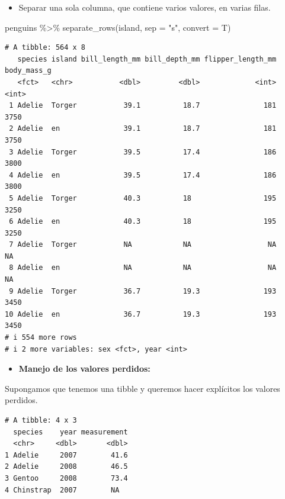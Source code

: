 \documentclass[
  letterpaper,
  DIV=11,
  numbers=noendperiod]{scrreprt}
\newenvironment{Shaded}{\begin{snugshade}}{\end{snugshade}}
\newcommand{\AttributeTok}[1]{\textcolor[rgb]{0.40,0.45,0.13}{#1}}
\newcommand{\FunctionTok}[1]{\textcolor[rgb]{0.28,0.35,0.67}{#1}}
\newcommand{\NormalTok}[1]{\textcolor[rgb]{0.00,0.23,0.31}{#1}}
\newcommand{\SpecialCharTok}[1]{\textcolor[rgb]{0.37,0.37,0.37}{#1}}
\newcommand{\StringTok}[1]{\textcolor[rgb]{0.13,0.47,0.30}{#1}}
\providecommand{\tightlist}{%
  \setlength{\itemsep}{0pt}\setlength{\parskip}{0pt}}\usepackage{longtable,booktabs,array}
\begin{document}
\begin{itemize}
\tightlist
\item
  Separar una sola columna, que contiene varios valores, en varias
  filas.
\end{itemize}

\begin{Shaded}
\begin{Highlighting}[]
\NormalTok{penguins }\SpecialCharTok{\%\textgreater{}\%} \FunctionTok{separate\_rows}\NormalTok{(island, }\AttributeTok{sep =} \StringTok{"s"}\NormalTok{, }\AttributeTok{convert =}\NormalTok{ T)}
\end{Highlighting}
\end{Shaded}

\begin{verbatim}
# A tibble: 564 x 8
   species island bill_length_mm bill_depth_mm flipper_length_mm body_mass_g
   <fct>   <chr>           <dbl>         <dbl>             <int>       <int>
 1 Adelie  Torger           39.1          18.7               181        3750
 2 Adelie  en               39.1          18.7               181        3750
 3 Adelie  Torger           39.5          17.4               186        3800
 4 Adelie  en               39.5          17.4               186        3800
 5 Adelie  Torger           40.3          18                 195        3250
 6 Adelie  en               40.3          18                 195        3250
 7 Adelie  Torger           NA            NA                  NA          NA
 8 Adelie  en               NA            NA                  NA          NA
 9 Adelie  Torger           36.7          19.3               193        3450
10 Adelie  en               36.7          19.3               193        3450
# i 554 more rows
# i 2 more variables: sex <fct>, year <int>
\end{verbatim}

\begin{itemize}
\tightlist
\item
  \textbf{Manejo de los valores perdidos:}
\end{itemize}

Supongamos que tenemos una tibble y queremos hacer explícitos los
valores perdidos.

\begin{verbatim}
# A tibble: 4 x 3
  species    year measurement
  <chr>     <dbl>       <dbl>
1 Adelie     2007        41.6
2 Adelie     2008        46.5
3 Gentoo     2008        73.4
4 Chinstrap  2007        NA  
\end{verbatim}
\end{document}
